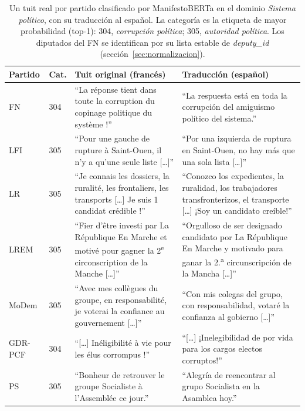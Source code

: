 \begin{table}[H]
\centering
\caption{Un tuit real por partido clasificado por ManifestoBERTa en el dominio
\emph{Sistema político}, con su traducción al español. La categoría es la etiqueta
de mayor probabilidad (top-1): 304, \emph{corrupción política}; 305,
\emph{autoridad política}. Los diputados del FN se identifican por su lista estable
de \emph{deputy\_id} (sección~\ref{sec:normalizacion}).}
\label{tab:ejemplos-metapolitica}
\footnotesize
\setlength{\tabcolsep}{4pt}
\renewcommand{\arraystretch}{1.25}
\begin{tabularx}{\textwidth}{@{}l l W W@{}}
\toprule
\textbf{Partido} & \textbf{Cat.} & \textbf{Tuit original (francés)} & \textbf{Traducción (español)} \\
\midrule
FN & 304 & ``La réponse tient dans toute la corruption du copinage politique du système !'' & ``La respuesta está en toda la corrupción del amiguismo político del sistema.'' \\
LFI & 305 & ``Pour une gauche de rupture à Saint-Ouen, il n'y a qu'une seule liste [\ldots]'' & ``Por una izquierda de ruptura en Saint-Ouen, no hay más que una sola lista [\ldots]'' \\
LR & 305 & ``Je connais les dossiers, la ruralité, les frontaliers, les transports [\ldots] Je suis 1 candidat crédible !'' & ``Conozco los expedientes, la ruralidad, los trabajadores transfronterizos, el transporte [\ldots] ¡Soy un candidato creíble!'' \\
LREM & 305 & ``Fier d'être investi par La République En Marche et motivé pour gagner la 2\textsuperscript{e} circonscription de la Manche [\ldots]'' & ``Orgulloso de ser designado candidato por La République En Marche y motivado para ganar la 2.\textsuperscript{a} circunscripción de la Mancha [\ldots]'' \\
MoDem & 305 & ``Avec mes collègues du groupe, en responsabilité, je voterai la confiance au gouvernement [\ldots]'' & ``Con mis colegas del grupo, con responsabilidad, votaré la confianza al gobierno [\ldots]'' \\
GDR-PCF & 304 & ``[\ldots] Inéligibilité à vie pour les élus corrompus !'' & ``[\ldots] ¡Inelegibilidad de por vida para los cargos electos corruptos!'' \\
PS & 305 & ``Bonheur de retrouver le groupe Socialiste à l'Assemblée ce jour.'' & ``Alegría de reencontrar al grupo Socialista en la Asamblea hoy.'' \\
\bottomrule
\end{tabularx}
\end{table}

